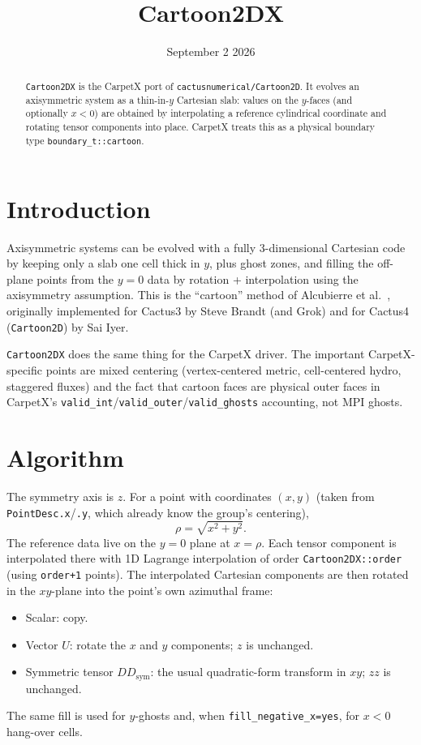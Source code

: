 \title{Cartoon2DX}

\date{September 2 2026}

\maketitle


\begin{abstract}
\texttt{Cartoon2DX} is the CarpetX port of \texttt{cactusnumerical/Cartoon2D}.
It evolves an axisymmetric system as a thin-in-$y$ Cartesian slab: values on
the $y$-faces (and optionally $x<0$) are obtained by interpolating a
reference cylindrical coordinate and rotating tensor components into
place. CarpetX treats this as a physical boundary type
\texttt{boundary\_t::cartoon}.
\end{abstract}

\section{Introduction}

Axisymmetric systems can be evolved with a fully 3-dimensional Cartesian
code by keeping only a slab one cell thick in $y$, plus ghost zones, and
filling the off-plane points from the $y=0$ data by rotation + interpolation using 
the axisymmetry assumption. This is the ``cartoon'' method of
Alcubierre et al.~\cite{SpacetimeX_Cartoon2DX_Alcubierre2001}, originally
implemented for Cactus3 by Steve Brandt (and Grok) and for Cactus4
(\texttt{Cartoon2D}) by Sai Iyer.

\texttt{Cartoon2DX} does the same thing for the CarpetX driver. The
important CarpetX-specific points are mixed centering (vertex-centered
metric, cell-centered hydro, staggered fluxes) and the fact that
cartoon faces are physical outer faces in CarpetX's
\texttt{valid\_int}/\texttt{valid\_outer}/\texttt{valid\_ghosts}
accounting, not MPI ghosts.

\section{Algorithm}

The symmetry axis is $z$. For a point with coordinates $(x,y)$ (taken
from \texttt{PointDesc.x}/\texttt{.y}, which already know the group's
centering),
\[
\rho = \sqrt{x^2+y^2}.
\]
The reference data live on the $y=0$ plane at $x=\rho$. Each tensor
component is interpolated there with 1D Lagrange interpolation of order
\texttt{Cartoon2DX::order} (using \texttt{order+1} points). The
interpolated Cartesian components are then rotated in the $xy$-plane
into the point's own azimuthal frame:
\begin{itemize}
\item Scalar: copy.
\item Vector $U$: rotate the $x$ and $y$ components; $z$ is unchanged.
\item Symmetric tensor $DD_{\mathrm{sym}}$: the usual quadratic-form
  transform in $xy$; $zz$ is unchanged.
\end{itemize}
The same fill is used for $y$-ghosts and, when
\texttt{fill\_negative\_x=yes}, for $x<0$ hang-over cells.

